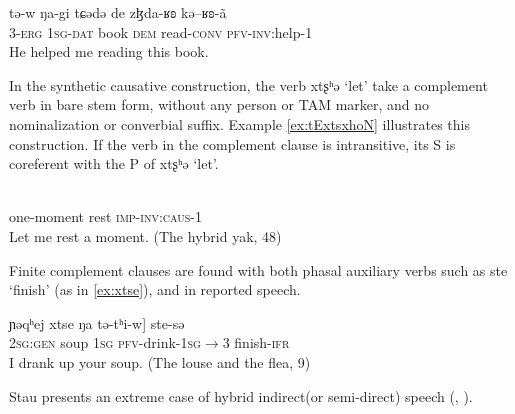 \documentclass[oneside,a4paper,11pt]{article}
\newcommand{\ipa}[1]{{\phon #1}} %
\begin{document}
\begin{exe}
\ex \label{ex:kERoN}
\gll 
\ipa{tə-w} 	\ipa{ŋa-gi} 	\ipa{tɕədə} 	\ipa{de} 	\ipa{zɮda-ʁʚ} 	\ipa{kə--ʁʚ-ã} \\
\textsc{3-erg} \textsc{1sg-dat} book \textsc{dem} read-\textsc{conv} \textsc{pfv-inv:}help-1 \\
\glt He helped me reading this book.
\end{exe}


In the synthetic causative construction, the verb \ipa{xtʂʰə} `let' take a complement verb in bare stem form, without any person or TAM marker, and no nominalization or converbial suffix. Example \ref{ex:tExtsxhoN} illustrates this construction. If the verb in the complement clause is intransitive, its S is coreferent with the P of \ipa{xtʂʰə} `let'.

\begin{exe}
\ex \label{ex:tExtsxhoN}
\gll 
[\ipa{e-ʑe} 	\ipa{nə}] 	\ipa{tə-xtʂʰə-ã} \\
one-moment rest \textsc{imp-inv:caus}-1 \\
\glt Let me rest a moment. (The hybrid yak, 48)
\end{exe}


%
% 
%		
%
%
%		
%		

Finite complement clauses are  found with both phasal auxiliary verbs such as \ipa{ste}  `finish' (as in \ref{ex:xtse}), and in reported speech.
\begin{exe}
\ex \label{ex:xtse}
\gll
\ipa{ɲəqʰej} 	\ipa{xtse} 	\ipa{ŋa} 	\ipa{tə-tʰi-w}]	\ipa{ste-sə} \\
\textsc{2sg:gen} soup \textsc{1sg} \textsc{pfv}-drink-\textsc{1sg$\rightarrow$3} finish-\textsc{ifr} \\
\glt I drank up your soup. (The louse and the flea, 9)
\end{exe}


Stau presents an extreme case of hybrid indirect(or semi-direct)  speech  (\citealt{aikhenvald08semidirect}, \citealt{tournadre08conjunct}). 
\end{document}
